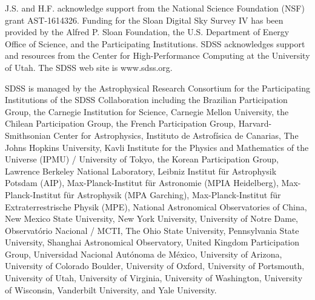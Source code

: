 \documentclass[iop,revtex4,twocolumn,apj,numberedappendix,appendixfloats]{emulateapj}
\begin{document}
\acknowledgments

J.S. and H.F. acknowledge support from the National Science Foundation (NSF) grant AST-1614326. Funding for the Sloan Digital Sky Survey IV has been provided by the Alfred P. Sloan Foundation, the U.S. Department of Energy Office of Science, and the Participating Institutions. SDSS acknowledges support and resources from the Center for High-Performance Computing at the University of Utah. The SDSS web site is www.sdss.org.

SDSS is managed by the Astrophysical Research Consortium for the Participating Institutions of the SDSS Collaboration including the Brazilian Participation Group, the Carnegie Institution for Science, Carnegie Mellon University, the Chilean Participation Group, the French Participation Group, Harvard-Smithsonian Center for Astrophysics, Instituto de Astrofísica de Canarias, The Johns Hopkins University, Kavli Institute for the Physics and Mathematics of the Universe (IPMU) / University of Tokyo, the Korean Participation Group, Lawrence Berkeley National Laboratory, Leibniz Institut für Astrophysik Potsdam (AIP), Max-Planck-Institut für Astronomie (MPIA Heidelberg), Max-Planck-Institut für Astrophysik (MPA Garching), Max-Planck-Institut für Extraterrestrische Physik (MPE), National Astronomical Observatories of China, New Mexico State University, New York University, University of Notre Dame, Observatório Nacional / MCTI, The Ohio State University, Pennsylvania State University, Shanghai Astronomical Observatory, United Kingdom Participation Group, Universidad Nacional Autónoma de México, University of Arizona, University of Colorado Boulder, University of Oxford, University of Portsmouth, University of Utah, University of Virginia, University of Washington, University of Wisconsin, Vanderbilt University, and Yale University.







\end{document}
